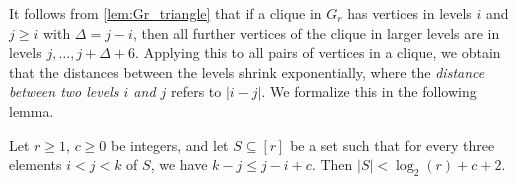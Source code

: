 %
%
%
It follows from \cref{lem:Gr_triangle} that if a clique in $G_r$ has vertices in levels $ i $ and $ j \geq i $ with $ \Delta = j - i $, then all further vertices of the clique in larger levels are in levels $ j, \dots, j + \Delta + 6 $.
Applying this to all pairs of vertices in a clique, we obtain that the distances between the levels shrink exponentially, where the \emph{distance between two levels $ i $ and $ j $} refers to $ |i - j| $.
We formalize this in the following lemma.
%
\begin{lemma}\label{lem:Gr_clique-levels}
    Let $ r \geq 1 $, $ c \geq 0 $ be integers, and let $ S \subseteq [r] $ be a set such that for every three elements $ i < j < k $ of $ S $, we have $ k - j \leq j - i + c $.
    Then $ |S| < \log_2(r) + c + 2 $.
\end{lemma}
%
